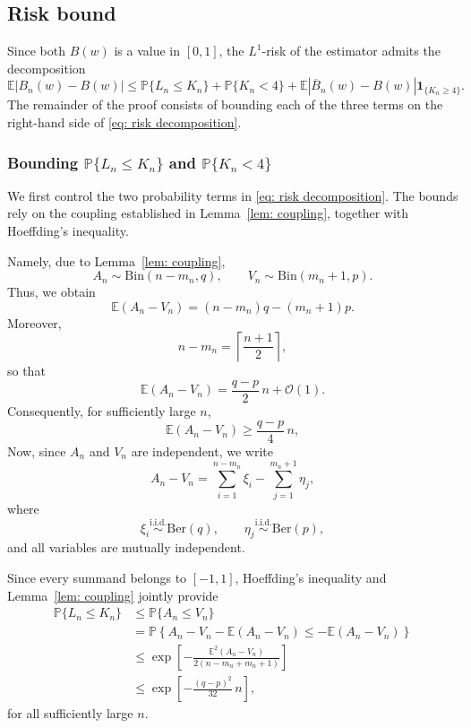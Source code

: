\documentclass[12pt]{article}
\newcommand{\1}{\mathbf{1}}
\begin{document}
\subsection{Risk bound}
 Since both $B(w)$ is a value in $[0,1]$, the $L^1$-risk of the estimator admits the decomposition
\begin{equation}\label{eq: risk decomposition}
\mathbb E|B_n(w)-B(w)|
\le
\mathbb P\{L_n\le K_n\}
+
\mathbb P\{K_n<4\}
+
\mathbb E|\overline B_n(w)-B(w)|\textbf{1}_{\{K_n\geq4\}}.
\end{equation}
The remainder of the proof consists of bounding each of the three terms on the right-hand side of \eqref{eq: risk decomposition}. 

\subsubsection{Bounding $\mathbb P\{L_n\le K_n\}$ and
$\mathbb P\{K_n<4\}$}

We first control the two probability terms in \eqref{eq: risk decomposition}. The bounds rely on the coupling established in Lemma~\ref{lem: coupling}, together with Hoeffding's inequality.  

Namely, due to Lemma~\ref{lem: coupling},
\[
A_n\sim\mathrm{Bin}(n-m_n,q),
\qquad
V_n\sim\mathrm{Bin}(m_n+1,p).
\]
Thus, we obtain
\[
\mathbb E(A_n-V_n)
=
(n-m_n)q-(m_n+1)p.
\]
Moreover,
\[
n-m_n
=
\left\lceil\frac{n+1}{2}\right\rceil,
\]
so that
\[
\mathbb E(A_n-V_n)
=
\frac{q-p}{2}\,n+\mathcal O(1).
\]
Consequently, for sufficiently large $n$,
\[
\mathbb E(A_n-V_n)
\ge
\frac{q-p}{4}\,n,
\]
Now, since $A_n$ and $V_n$ are independent, we write
\[
A_n-V_n
=
\sum_{i=1}^{n-m_n}\xi_i
-
\sum_{j=1}^{m_n+1}\eta_j,
\]
where
\[
\xi_i\stackrel{\mathrm{i.i.d.}}{\sim}\mathrm{Ber}(q),
\qquad
\eta_j\stackrel{\mathrm{i.i.d.}}{\sim}\mathrm{Ber}(p),
\]
and all variables are mutually independent.

Since every summand belongs to $[-1,1]$, Hoeffding's inequality and Lemma~\ref{lem: coupling} jointly provide
\begin{align*}
\mathbb P\{L_n\le K_n\}
&
\le
\mathbb P\{A_n\le V_n\}
\\
&
=
\mathbb P\!\left\{
A_n-V_n-\mathbb E(A_n-V_n)
\le
-\mathbb E(A_n-V_n)
\right\}
\\
&
\le
\exp\!\left[
-\frac{\mathbb E^2(A_n-V_n)}
{2(n-m_n+m_n+1)}
\right]
\\
&
\le
\exp\!\left[
-\frac{(q-p)^2}{32}\,n
\right],
\end{align*}
for all sufficiently large $n$.
\end{document}
